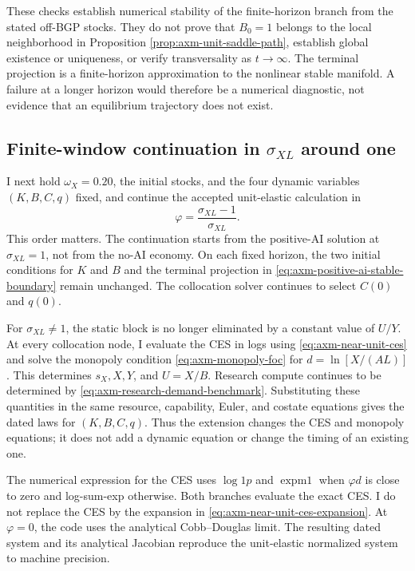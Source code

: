 These checks establish numerical stability of the finite-horizon branch from
the stated off-BGP stocks. They do not prove that \(B_0=1\) belongs to the
local neighborhood in Proposition \ref{prop:axm-unit-saddle-path}, establish
global existence or uniqueness, or verify transversality as \(t\to\infty\).
The terminal projection is a finite-horizon approximation to the nonlinear
stable manifold. A failure at a longer horizon would therefore be a numerical
diagnostic, not evidence that an equilibrium trajectory does not exist.

\subsection{\texorpdfstring{Finite-window continuation in \(\sigma_{XL}\) around one}{Finite-window continuation in sigma XL around one}}
\label{app:axm-near-unit-algorithm}

I next hold \(\omega_X=0.20\), the initial stocks, and the four dynamic
variables \((K,B,C,q)\) fixed, and continue the accepted unit-elastic
calculation in
\[
 \varphi=\frac{\sigma_{XL}-1}{\sigma_{XL}}.
\]
This order matters. The continuation starts from the positive-AI solution at
\(\sigma_{XL}=1\), not from the no-AI economy. On each fixed horizon, the two
initial conditions for \(K\) and \(B\) and the terminal projection in
\eqref{eq:axm-positive-ai-stable-boundary} remain unchanged. The collocation
solver continues to select \(C(0)\) and \(q(0)\).

For \(\sigma_{XL}\neq1\), the static block is no longer eliminated by a
constant value of \(U/Y\). At every collocation node, I evaluate the CES in
logs using \eqref{eq:axm-near-unit-ces} and solve the monopoly condition
\eqref{eq:axm-monopoly-foc} for \(d=\ln[X/(AL)]\). This determines
\(s_X,X,Y\), and \(U=X/B\). Research compute continues to be determined by
\eqref{eq:axm-research-demand-benchmark}. Substituting these quantities in the
same resource, capability, Euler, and costate equations gives the dated laws
for \((K,B,C,q)\). Thus the extension changes the CES and monopoly equations;
it does not add a dynamic equation or change the timing of an existing one.

The numerical expression for the CES uses \(\log1p\) and \(\operatorname{expm1}\)
when \(\varphi d\) is close to zero and log-sum-exp otherwise. Both branches
evaluate the exact CES. I do not replace the CES by the expansion in
\eqref{eq:axm-near-unit-ces-expansion}. At \(\varphi=0\), the code uses the
analytical Cobb--Douglas limit. The resulting dated system and its analytical
Jacobian reproduce the unit-elastic normalized system to machine precision.

